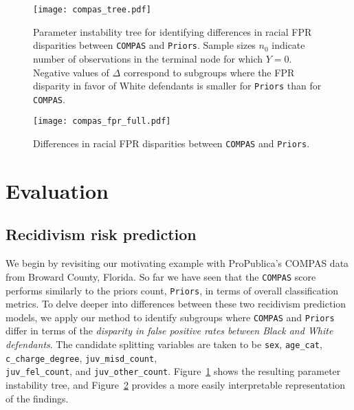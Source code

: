 \documentclass[11pt, sigconf, svgnames]{acmart}
\begin{document}
\begin{figure}[t]
\texttt{[image: compas\_tree.pdf]}
\caption{Parameter instability tree for identifying differences in racial FPR disparities between \texttt{COMPAS} and \texttt{Priors}.  Sample sizes $n_0$ indicate number of observations in the terminal node for which $Y = 0$.  Negative values of $\Delta$ correspond to subgroups where the FPR disparity in favor of White defendants is smaller for \texttt{Priors} than for \texttt{COMPAS}.}
\label{fig:compas_tree}
\end{figure}

\begin{figure}[t]
\texttt{[image: compas\_fpr\_full.pdf]}
\caption{Differences in racial FPR disparities between \texttt{COMPAS} and \texttt{Priors}.}
\label{fig:compas_fpr}
\end{figure}


\section{Evaluation}




\subsection{Recidivism risk prediction} \label{sec:compas_vs_priors}


We begin by revisiting our motivating example with ProPublica's COMPAS data from Broward County, Florida. So far we have seen that the \texttt{COMPAS} score performs similarly to the priors count, \texttt{Priors}, in terms of overall classification metrics.  To delve deeper into differences between these two recidivism prediction models, we apply our method to identify subgroups where \texttt{COMPAS} and \texttt{Priors} differ in terms of the \emph{disparity in false positive rates between Black and White defendants}.  The candidate splitting variables are taken to be \verb|sex|, \verb|age_cat|, \verb|c_charge_degree|, \verb|juv_misd_count|, \\ \verb|juv_fel_count|, and \verb|juv_other_count|.  Figure~\ref{fig:compas_tree} shows the resulting parameter instability tree, and Figure~\ref{fig:compas_fpr} provides a more easily interpretable representation of the findings.  
\end{document}
